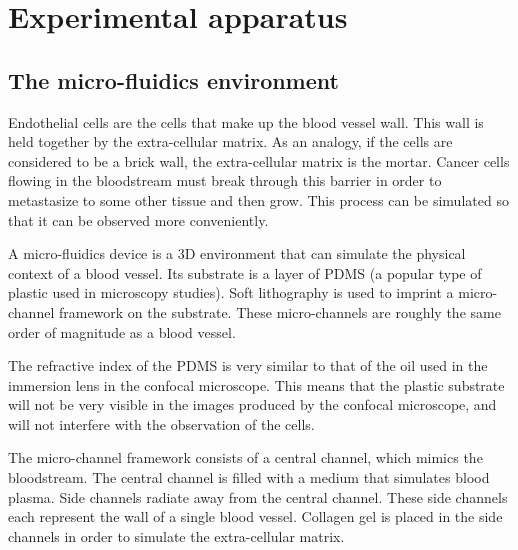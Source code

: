 
\chapter{Experimental apparatus}

\ifpdf
    \graphicspath{{Chapter4/Figs/Raster/}{Chapter4/Figs/PDF/}{Chapter4/Figs/}}
\else
    \graphicspath{{Chapter4/Figs/Vector/}{Chapter4/Figs/}}
\fi

\section{The micro-fluidics environment}

Endothelial cells are the cells that make up the blood vessel wall. This wall is held together by the extra-cellular matrix. As an analogy, if the cells are considered to be a brick wall, the extra-cellular matrix is the mortar. Cancer cells flowing in the bloodstream must break through this barrier in order to metastasize to some other tissue and then grow.  This process can be simulated so that it can be observed more conveniently.

A micro-fluidics device is a 3D environment that can simulate the physical context of a blood vessel. Its substrate is a layer of PDMS (a popular type of plastic used in microscopy studies). Soft lithography is used to imprint a micro-channel framework on the substrate. These micro-channels are roughly the same order of magnitude as a blood vessel.

The refractive index of the PDMS is very similar to that of the oil used in the immersion lens in the confocal microscope. This means that the plastic substrate will not be very visible in the images produced by the confocal microscope, and will not interfere with the observation of the cells.

The micro-channel framework consists of a central channel, which mimics the bloodstream. The central channel is filled with a medium that simulates blood plasma. Side channels radiate away from the central channel. These side channels each represent the wall of a single blood vessel. Collagen gel is placed in the side channels in order to simulate the extra-cellular matrix.

